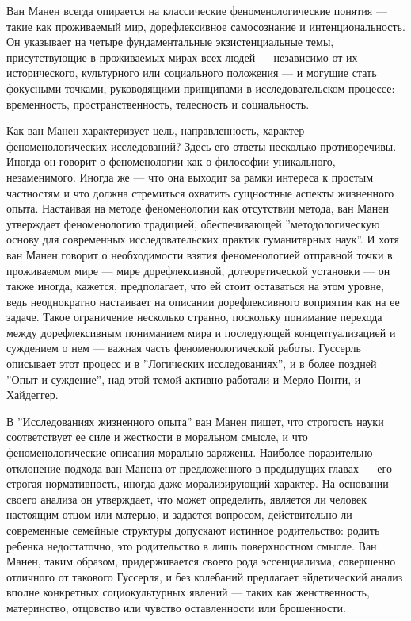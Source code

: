 \documentclass[11pt]{book}
\begin{document}
\begin{enumerate}
Ван Манен всегда опирается на классические феноменологические понятия --- такие как проживаемый мир, дорефлексивное самосознание и интенциональность. Он указывает на четыре фундаментальные экзистенциальные темы, присутствующие в проживаемых мирах всех людей --- независимо от их исторического, культурного или социального положения --- и могущие стать фокусными точками, руководящими принципами в исследовательском процессе: временность, пространственность, телесность и социальность.

Как ван Манен характеризует цель, направленность, характер феноменологических исследований? Здесь его ответы несколько противоречивы. Иногда он говорит о феноменологии как о философии уникального, незаменимого. Иногда же --- что она выходит за рамки интереса к простым частностям и что должна стремиться охватить сущностные аспекты жизненного опыта. Настаивая на методе феноменологии как отсутствии метода, ван Манен утверждает феноменологию традицией, обеспечивающей ''методологическую основу для современных исследовательских практик гуманитарных наук''. И хотя ван Манен говорит о необходимости взятия феноменологией отправной точки в проживаемом мире --- мире дорефлексивной, дотеоретической установки --- он также иногда, кажется, предполагает, что ей стоит оставаться на этом уровне, ведь неоднократно настаивает на описании дорефлексивного воприятия как на ее задаче. Такое ограничение несколько странно, поскольку понимание перехода между дорефлексивным пониманием мира и последующей концептуализацией и суждением о нем --- важная часть феноменологической работы. Гуссерль описывает этот процесс и в ''Логических исследованиях'', и в более поздней ''Опыт и суждение'', над этой темой активно работали и Мерло-Понти, и Хайдеггер.

В ''Исследованиях жизненного опыта'' ван Манен пишет, что строгость науки соответствует ее силе и жесткости в моральном смысле, и что феноменологические описания морально заряжены. Наиболее поразительно отклонение подхода ван Манена от предложенного в предыдущих главах --- его строгая нормативность, иногда даже морализирующий характер. На основании своего анализа он утверждает, что может определить, является ли человек настоящим отцом или матерью, и задается вопросом, действительно ли современные семейные структуры допускают истинное родительство: родить ребенка недостаточно, это родительство в лишь поверхностном смысле. Ван Манен, таким образом, придерживается своего рода эссенциализма, совершенно отличного от такового Гуссерля, и без колебаний предлагает эйдетический анализ вполне конкретных социокультурных явлений --- таких как женственность, материнство, отцовство или чувство оставленности или брошенности.


\end{enumerate}
\end{document}
